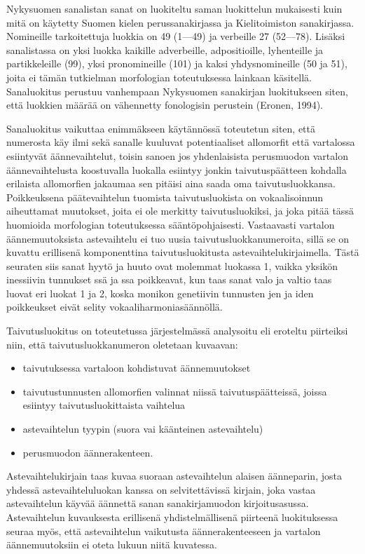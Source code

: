 \documentclass[free]{flammie}
\begin{document}
Nykysuomen sanalistan sanat on luokiteltu saman luokittelun mukaisesti kuin mitä on käytetty Suomen kielen perussanakirjassa ja Kielitoimiston sanakirjassa.
Nomineille tarkoitettuja luokkia on 49 (1—49) ja verbeille 27 (52—78). Lisäksi sanalistassa on yksi luokka kaikille adverbeille, adpositioille, lyhenteille ja partikkeleille (99), yksi pronomineille (101) ja kaksi yhdysnomineille (50 ja 51), joita ei tämän tutkielman morfologian toteutuksessa lainkaan käsitellä. Sanaluokitus
perustuu vanhempaan Nykysuomen sanakirjan luokitukseen siten, että luokkien
määrää on vähennetty fonologisin perustein (Eronen, 1994).

Sanaluokitus vaikuttaa enimmäkseen käytännössä toteutetun siten, että numerosta käy ilmi sekä sanalle kuuluvat potentiaaliset allomorfit että vartalossa esiintyvät äännevaihtelut, toisin sanoen jos yhdenlaisista perusmuodon vartalon äännevaihtelusta koostuvalla luokalla esiintyy jonkin taivutuspäätteen kohdalla erilaista
allomorfien jakaumaa sen pitäisi aina saada oma taivutusluokkansa. Poikkeuksena päätevaihtelun tuomista taivutusluokista on vokaalisoinnun aiheuttamat muutokset, joita ei ole merkitty taivutusluokiksi, ja joka pitää tässä huomioida morfologian toteutuksessa sääntöpohjaisesti. Vastaavasti vartalon äännemuutoksista
astevaihtelu ei tuo uusia taivutusluokkanumeroita, sillä se on kuvattu erillisenä
komponenttina taivutusluokitusta astevaihtelukirjaimella. Tästä seuraten siis sanat hyytö ja huuto ovat molemmat luokassa 1, vaikka yksikön inessiivin tunnukset
ssä ja ssa poikkeavat, kun taas sanat valo ja valtio taas luovat eri luokat 1 ja 2,
koska monikon genetiivin tunnusten jen ja iden poikkeukset eivät selity vokaaliharmoniasäännöllä.

Taivutusluokitus on toteutetussa järjestelmässä analysoitu eli eroteltu piirteiksi
niin, että taivutusluokkanumeron oletetaan kuvaavan:

\begin{itemize}
\item taivutuksessa vartaloon kohdistuvat äännemuutokset
\item taivutustunnusten allomorfien valinnat niissä taivutuspäätteissä, joissa esiintyy taivutusluokittaista vaihtelua
\item astevaihtelun tyypin (suora vai käänteinen astevaihtelu)
\item perusmuodon äännerakenteen.
\end{itemize}

Astevaihtelukirjain taas kuvaa suoraan astevaihtelun alaisen äänneparin, josta yhdessä astevaihteluluokan kanssa on selvitettävissä kirjain, joka vastaa astevaihtelun käyvää äännettä sanan sanakirjamuodon kirjoitusasussa. Astevaihtelun kuvauksesta erillisenä yhdistelmällisenä piirteenä luokituksessa seuraa myös, että
astevaihtelun vaikutusta äännerakenteeseen ja vartalon äännemuutoksiin ei oteta
lukuun niitä kuvatessa.
\end{document}
